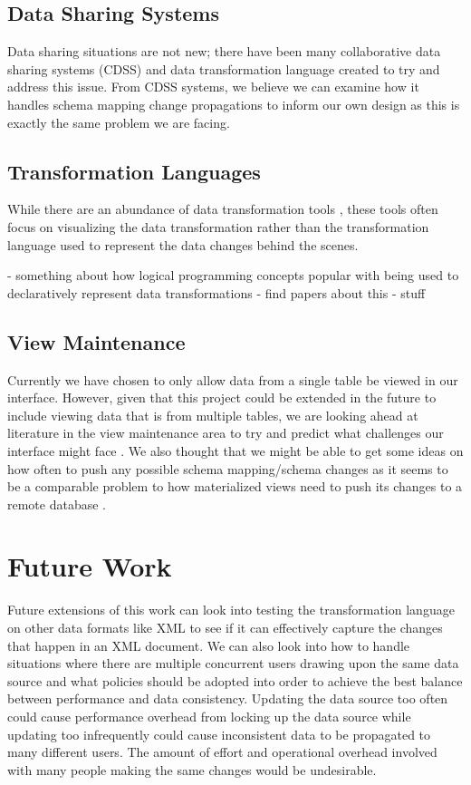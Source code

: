 \documentclass[12pt]{article}
\begin{document}
\subsection{Data Sharing Systems}
Data sharing situations are not new; there have been many collaborative data sharing systems (CDSS) \cite{ives2008orchestra, ives2005orchestra, karvounarakis2013collaborative}and data transformation language \cite{kandel2011wrangler, lakshmanan2001schemasql} created to try and address this issue. From CDSS systems, we believe we can examine how it handles schema mapping change propagations to inform our own design as this is exactly the same problem we are facing. 

\subsection{Transformation Languages}
While there are an abundance of data transformation tools \cite{raman2001potter, kandel2011wrangler}, these tools often focus on visualizing the data transformation rather than the transformation language used to represent the data changes behind the scenes. 

- something about how logical programming concepts popular with being used to declaratively represent data transformations
- find papers about this
- stuff

\subsection{View Maintenance}
Currently we have chosen to only allow data from a single table be viewed in our interface. However, given that this project could be extended in the future to include viewing data that is from multiple tables, we are looking ahead at literature in the view maintenance area to try and predict what challenges our interface might face \cite{ agrawal1997efficient, agrawal2009asynchronous, gupta1999materialized, zhou2007lazy}. We also thought that we might be able to get some ideas on how often to push any possible schema mapping/schema changes as it seems to be a comparable problem to how materialized views need to push its changes to a remote database \cite{agrawal1997efficient, agrawal2009asynchronous, zhou2007lazy}. 


\section{Future Work}
Future extensions of this work can look into testing the transformation language on other data formats like XML to see if it can effectively capture the changes that happen in an XML document. We can also look into how to handle situations where there are multiple concurrent users drawing upon the same data source and what policies should be adopted into order to achieve the best balance between performance and data consistency. Updating the data source too often could cause performance overhead from locking up the data source while updating too infrequently could cause inconsistent data to be propagated to many different users. The amount of effort and operational overhead involved with many people making the same changes would be undesirable. 
\end{document}
